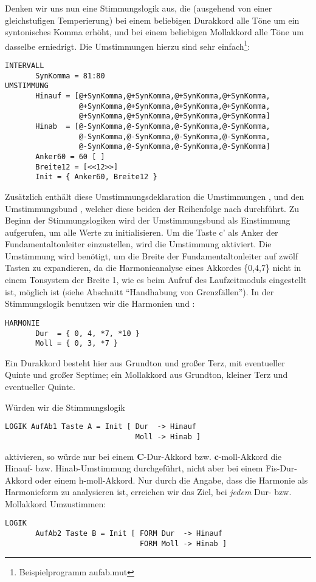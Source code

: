 Denken wir uns nun eine Stimmungslogik aus, die (ausgehend von einer 
gleichstufigen Temperierung) bei einem beliebigen Durakkord alle 
Töne um ein syntonisches Komma erhöht, und bei einem beliebigen 
Mollakkord alle Töne um dasselbe erniedrigt. Die Umstimmungen hierzu 
sind sehr einfach\footnote{Beispielprogramm aufab.mut}:
\label{AUFAB}
\begin{verbatim}
INTERVALL
       SynKomma = 81:80
UMSTIMMUNG
       Hinauf = [@+SynKomma,@+SynKomma,@+SynKomma,@+SynKomma,
                 @+SynKomma,@+SynKomma,@+SynKomma,@+SynKomma,
                 @+SynKomma,@+SynKomma,@+SynKomma,@+SynKomma]
       Hinab  = [@-SynKomma,@-SynKomma,@-SynKomma,@-SynKomma,
                 @-SynKomma,@-SynKomma,@-SynKomma,@-SynKomma,
                 @-SynKomma,@-SynKomma,@-SynKomma,@-SynKomma]
       Anker60 = 60 [ ]
       Breite12 = [<<12>>]
       Init = { Anker60, Breite12 }
\end{verbatim}
Zusätzlich enthält diese Umstimmungsdeklaration die Umstimmungen , 
 und den Umstimmungsbund , welcher diese beiden der Reihenfolge 
nach durchführt. Zu Beginn der Stimmungslogiken wird der Umstimmungsbund 
 als Einstimmung aufgerufen, um alle Werte zu initialisieren. Um 
die Taste c' als Anker der Fundamentaltonleiter einzustellen, wird die 
Umstimmung  aktiviert. Die Umstimmung  wird benötigt, um 
die Breite der Fundamentaltonleiter auf zwölf Tasten zu expandieren, da 
die Harmonieanalyse eines Akkordes \{0,4,7\} nicht in einem Tonsystem der 
Breite 1, wie es beim Aufruf des Laufzeitmoduls eingestellt ist, möglich 
ist (siehe Abschnitt "`Handhabung von Grenzfällen"').
In der Stimmungslogik benutzen wir die Harmonien  
und :
\begin{verbatim}
HARMONIE
	   Dur  = { 0, 4, *7, *10 }
	   Moll = { 0, 3, *7 }
\end{verbatim}

Ein Durakkord besteht hier aus Grundton und großer Terz, mit eventueller 
Quinte und großer Septime; ein Mollakkord aus Grundton, kleiner Terz und 
eventueller Quinte.

Würden wir die Stimmungslogik
\begin{verbatim}
LOGIK AufAb1 Taste A = Init [ Dur  -> Hinauf
                              Moll -> Hinab ]
\end{verbatim}
aktivieren, so würde nur bei einem \textbf{C}-Dur-Akkord bzw. 
\textbf{c}-moll-Akkord die Hinauf- bzw. Hinab-Umstimmung durchgeführt, 
nicht aber bei einem Fis-Dur-Akkord oder einem h-moll-Akkord.
Nur durch die Angabe, dass die Harmonie als Harmonieform zu analysieren ist, 
erreichen wir das Ziel, bei \emph{jedem} Dur- bzw. Mollakkord Umzustimmen:
\begin{verbatim}
LOGIK
       AufAb2 Taste B = Init [ FORM Dur  -> Hinauf
                               FORM Moll -> Hinab ]
\end{verbatim}

